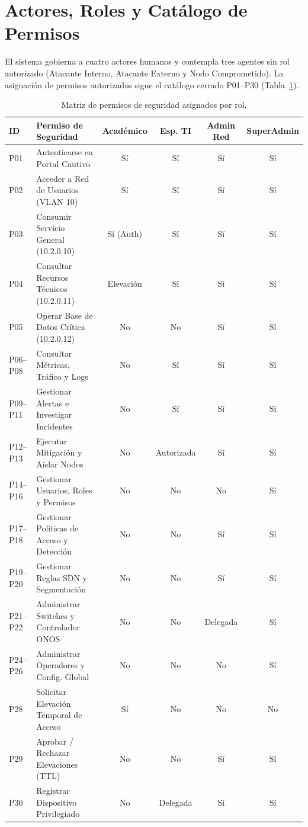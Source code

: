 \documentclass[11pt,a4paper]{report}
\begin{document}
\section{Actores, Roles y Catálogo de Permisos}
El sistema gobierna a cuatro actores humanos y contempla tres agentes sin rol autorizado (Atacante Interno, Atacante Externo y Nodo Comprometido). La asignación de permisos autorizados sigue el catálogo cerrado P01--P30 (Tabla~\ref{tab:permisos}).

\begin{table}[h!]
\centering
\small
\begin{tabularx}{\linewidth}{p{1.2cm}p{4.2cm}cccc}
\toprule
\textbf{ID} & \textbf{Permiso de Seguridad} & \textbf{Académico} & \textbf{Esp. TI} & \textbf{Admin Red} & \textbf{SuperAdmin} \\
\midrule
P01 & Autenticarse en Portal Cautivo & Sí & Sí & Sí & Sí \\
P02 & Acceder a Red de Usuarios (VLAN 10) & Sí & Sí & Sí & Sí \\
P03 & Consumir Servicio General (10.2.0.10) & Sí (Auth) & Sí & Sí & Sí \\
P04 & Consultar Recursos Técnicos (10.2.0.11) & Elevación & Sí & Sí & Sí \\
P05 & Operar Base de Datos Crítica (10.2.0.12) & No & No & Sí & Sí \\
P06--P08 & Consultar Métricas, Tráfico y Logs & No & Sí & Sí & Sí \\
P09--P11 & Gestionar Alertas e Investigar Incidentes & No & Sí & Sí & Sí \\
P12--P13 & Ejecutar Mitigación y Aislar Nodos & No & Autorizada & Sí & Sí \\
P14--P16 & Gestionar Usuarios, Roles y Permisos & No & No & No & Sí \\
P17--P18 & Gestionar Políticas de Acceso y Detección & No & No & Sí & Sí \\
P19--P20 & Gestionar Reglas SDN y Segmentación & No & No & Sí & Sí \\
P21--P22 & Administrar Switches y Controlador ONOS & No & No & Delegada & Sí \\
P24--P26 & Administrar Operadores y Config. Global & No & No & No & Sí \\
P28 & Solicitar Elevación Temporal de Acceso & Sí & No & No & No \\
P29 & Aprobar / Rechazar Elevaciones (TTL) & No & No & Sí & Sí \\
P30 & Registrar Dispositivo Privilegiado & No & Delegada & Sí & Sí \\
\bottomrule
\end{tabularx}
\caption{Matriz de permisos de seguridad asignados por rol.}
\label{tab:permisos}
\end{table}
\end{document}
